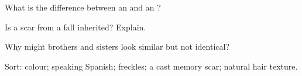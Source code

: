 \begin{exercise}[$\star$]\label{exo:g4:traits:2}
What is the difference between an  and an ?
\end{exercise}

\begin{exercise}[$\star$]\label{exo:g4:traits:3}
Is a scar from a fall inherited? Explain.
\end{exercise}

\begin{exercise}[$\star$]\label{exo:g4:traits:4}
Why might brothers and sisters look similar but not identical?
\end{exercise}

\begin{exercise}[$\star\star$]\label{exo:g4:traits:5}
Sort:  colour; speaking Spanish; freckles; a  cast memory
scar; natural hair texture.
\end{exercise}

